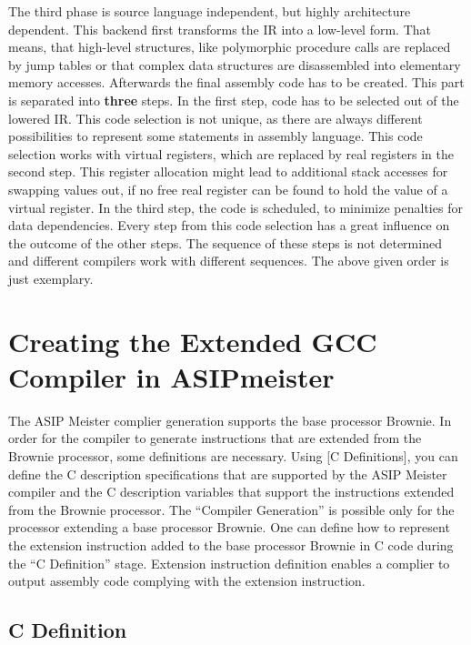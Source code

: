 The third phase is source language independent, but highly architecture
dependent. This backend first transforms the IR into a low-level form.
That means, that high-level structures, like polymorphic procedure calls
are replaced by jump tables or that complex data structures are
disassembled into elementary memory accesses. Afterwards the final
assembly code has to be created. This part is separated into
\textbf{three} steps. In the first step, code has to be selected out of
the lowered IR. This code selection is not unique, as there are always
different possibilities to represent some statements in assembly
language. This code selection works with virtual registers, which are
replaced by real registers in the second step. This register allocation
might lead to additional stack accesses for swapping values out, if no
free real register can be found to hold the value of a virtual register.
In the third step, the code is scheduled, to minimize penalties for data
dependencies. Every step from this code selection has a great influence
on the outcome of the other steps. The sequence of these steps is not
determined and different compilers work with different sequences. The
above given order is just exemplary.

\hypertarget{creating-the-extended-gcc-compiler-in-asipmeister}{%
\section{Creating the Extended GCC Compiler in
ASIPmeister}\label{creating-the-extended-gcc-compiler-in-asipmeister}}

The ASIP Meister complier generation supports the base processor
Brownie. In order for the compiler to generate instructions that are
extended from the Brownie processor, some definitions are necessary.
Using {[}C Definitions{]}, you can define the C description
specifications that are supported by the ASIP Meister compiler and the C
description variables that support the instructions extended from the
Brownie processor. The ``Compiler Generation'' is possible only for the
processor extending a base processor Brownie. One can define how to
represent the extension instruction added to the base processor Brownie
in C code during the ``C Definition'' stage. Extension instruction
definition enables a complier to output assembly code complying with the
extension instruction.

\hypertarget{c-definition}{%
\subsection{C Definition}\label{c-definition}}

